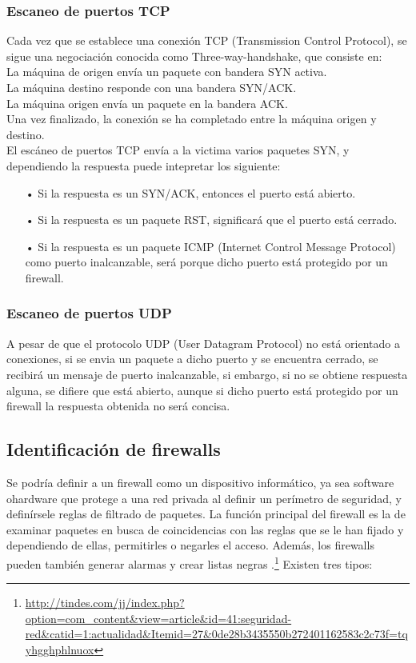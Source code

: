 \documentclass[11pt,a4paper]{article}
\begin{document}
\subsubsection{Escaneo de puertos TCP}
Cada vez que se establece una conexión TCP (Transmission Control Protocol), se sigue una negociación conocida como Three-way-handshake, que consiste en:\\
La máquina de origen envía un paquete con bandera SYN activa.\\
La máquina destino responde con una bandera SYN/ACK.\\
La máquina origen envía un paquete en la bandera ACK.\\
Una vez finalizado, la conexión se ha completado entre la máquina origen y destino.\\
El escáneo de puertos TCP envía a la victima varios paquetes SYN, y dependiendo la respuesta puede intepretar los siguiente:
\begin{itemize}
	\item[•] Si la respuesta es un SYN/ACK, entonces el puerto está abierto.
	\item[•] Si la respuesta es un paquete RST, significará que el puerto está cerrado.
	\item[•] Si la respuesta es  un  paquete ICMP  (Internet  Control Message  Protocol) como puerto inalcanzable, será porque dicho puerto está protegido por un firewall.
\end{itemize}

\subsubsection{Escaneo 	de puertos UDP}
A pesar de que el protocolo UDP (User Datagram Protocol) no está orientado a conexiones, si se envia un paquete a dicho puerto y se encuentra cerrado, se recibirá un mensaje de puerto inalcanzable, si embargo, si no se obtiene respuesta alguna, se difiere que está abierto, aunque si dicho puerto está protegido por un firewall la respuesta obtenida no será concisa.

\subsection{Identificación de firewalls}
Se podría definir a un firewall como un dispositivo informático, ya sea software ohardware que protege a una red privada al definir un perímetro de seguridad, y definírsele reglas de filtrado de paquetes.  La  función  principal  del firewall  es  la  de  examinar  paquetes  en  busca  de coincidencias  con  las  reglas  que  se  le  han  fijado  y  dependiendo  de  ellas, permitirles o negarles el acceso. Además, los firewalls pueden también generar alarmas y crear listas negras
.\footnote{ \url {http://tindes.com/jj/index.php?option=com_content&view=article&id=41:seguridad-red&catid=1:actualidad&Itemid=27&0de28b3435550b272401162583c2c73f=tqyhgghphlnuox}}
Existen tres tipos:
\end{document}
